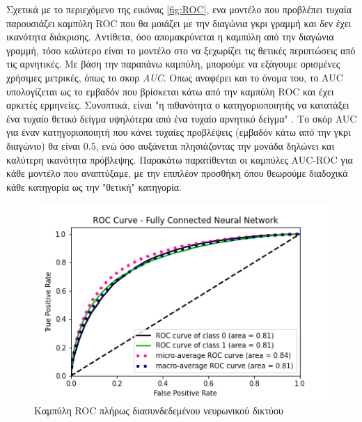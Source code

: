 \smallskip
Σχετικά με το περιεχόμενο της εικόνας \ref{fig:ROC}, ενα μοντέλο που προβλέπει τυχαία παρουσιάζει καμπύλη ROC που θα μοιάζει με την διαγώνια γκρι γραμμή και δεν έχει ικανότητα διάκρισης. Αντίθετα, όσο απομακρύνεται η καμπύλη από την διαγώνια γραμμή, τόσο καλύτερο είναι το μοντέλο στο να ξεχωρίζει τις θετικές περιπτώσεις από τις αρνητικές. Με βάση την παραπάνω καμπύλη, μπορούμε να εξάγουμε ορισμένες χρήσιμες μετρικές, όπως το σκορ \textit{AUC}. Οπως αναφέρει και το όνομα του, το AUC υπολογίζεται ως το εμβαδόν που βρίσκεται κάτω από την καμπύλη ROC και έχει αρκετές ερμηνείες. Συνοπτικά, είναι "η πιθανότητα ο κατηγοριοποιητής να κατατάξει ένα τυχαίο θετικό δείγμα υψηλότερα από ένα τυχαίο αρνητικό δείγμα" \cite{Hand2009MeasuringCP}. Το σκόρ AUC για έναν κατηγοριοποιητή που κάνει τυχαίες προβλέψεις (εμβαδόν κάτω από την γκρι διαγώνιο) θα είναι $0.5$, ενώ όσο αυξάνεται πλησιάζοντας την μονάδα δηλώνει και καλύτερη ικανότητα πρόβλεψης. Παρακάτω παρατίθενται οι καμπύλες AUC-ROC για κάθε μοντέλο που αναπτύξαμε, με την επιπλέον προσθήκη όπου θεωρούμε διαδοχικά κάθε κατηγορία ως την "θετική" κατηγορία.

\begin{figure}[H]
  \centering
  \includegraphics[width=1\textwidth]{images/DNNROC.png}
  \caption{Καμπύλη ROC πλήρως διασυνδεδεμένου νευρωνικού δικτύου}
  \label{fig:DNNROC}
\end{figure}

